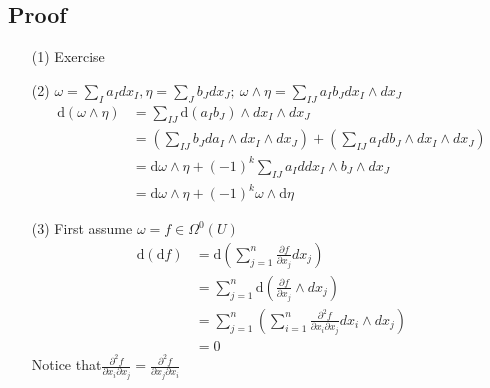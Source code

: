 \documentclass{book}
\begin{document}
\subsection*{Proof}
\begin{itemize}
    \item [(1)]Exercise
    \item [(2)]$\omega=\sum\limits_Ia_Idx_I,\eta=\sum\limits_Jb_Jdx_J;\ \omega\wedge\eta=\sum\limits_{IJ}a_Ib_Jdx_I\wedge dx_J$
    $$\begin{aligned}
        \text{d}(\omega\wedge\eta) &=\sum\limits_{IJ}\text{d}(a_Ib_J)\wedge dx_I\wedge dx_J\\
        &=(\sum\limits_{IJ}b_Jda_I\wedge dx_I\wedge dx_J)+(\sum\limits_{IJ}a_Idb_J\wedge dx_I\wedge dx_J)\\
        &=\text{d}\omega\wedge\eta+(-1)^k\sum\limits_{IJ}a_Id dx_I\wedge b_J\wedge dx_J\\
        &=\text{d}\omega\wedge\eta+(-1)^k\omega\wedge\text{d}\eta
    \end{aligned}$$
    \item [(3)]First assume $\omega=f\in\Omega^0(U)$
        $$\begin{aligned}
            \text{d}(\text{d}f)&=\text{d}(\sum\limits_{j=1}^n\frac{\partial f}{\partial x_j}dx_j)\\
            &=\sum\limits_{j=1}^n\text{d}(\frac{\partial f}{\partial x_j}\wedge dx_j)\\
            &=\sum\limits_{j=1}^n(\sum\limits_{i=1}^n\frac{\partial^2 f}{\partial x_i\partial x_j}dx_i\wedge dx_j)\\
            &=0
        \end{aligned}$$
        Notice that$\frac{\partial^2 f}{\partial x_i\partial x_j}=\frac{\partial^2 f}{\partial x_j\partial x_i}$


\end{itemize}
\end{document}
